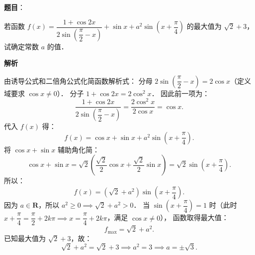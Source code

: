 \begin{answer}

\textbf{题目}：

若函数 $f(x) = \dfrac{1 + \cos 2x}{2\sin\left(\dfrac{\pi}{2} - x\right)} + \sin x + a^2 \sin\left(x + \dfrac{\pi}{4}\right)$ 的最大值为 $\sqrt{2} + 3$，试确定常数 $a$ 的值．

\textbf{解析}

由诱导公式和二倍角公式化简函数解析式：
分母 $2\sin\left(\dfrac{\pi}{2} - x\right) = 2\cos x$（定义域要求 $\cos x \neq 0$）．
分子 $1 + \cos 2x = 2\cos^2 x$．
因此前一项为：
\nopagebreak[4]
\[
\frac{1 + \cos 2x}{2\sin\left(\dfrac{\pi}{2} - x\right)} = \frac{2\cos^2 x}{2\cos x} = \cos x.
\]
代入 $f(x)$ 得：
\nopagebreak[4]
\[
f(x) = \cos x + \sin x + a^2 \sin\left(x + \frac{\pi}{4}\right).
\]
将 $\cos x + \sin x$ 辅助角化简：
\nopagebreak[4]
\[
\cos x + \sin x = \sqrt{2}\left(\frac{\sqrt{2}}{2}\cos x + \frac{\sqrt{2}}{2}\sin x\right) = \sqrt{2}\sin\left(x + \frac{\pi}{4}\right).
\]
所以：
\nopagebreak[4]
\[
f(x) = (\sqrt{2} + a^2)\sin\left(x + \frac{\pi}{4}\right).
\]
因为 $a \in \mathbf{R}$，所以 $a^2 \geqslant 0 \implies \sqrt{2} + a^2 > 0$．
当 $\sin\left(x + \dfrac{\pi}{4}\right) = 1$ 时（此时 $x + \dfrac{\pi}{4} = \dfrac{\pi}{2} + 2k\pi \implies x = \dfrac{\pi}{4} + 2k\pi$，满足 $\cos x \neq 0$），
函数取得最大值：
\nopagebreak[4]
\[
f_{\max} = \sqrt{2} + a^2.
\]
已知最大值为 $\sqrt{2} + 3$，故：
\nopagebreak[4]
\[
\sqrt{2} + a^2 = \sqrt{2} + 3 \implies a^2 = 3 \implies a = \pm\sqrt{3}.
\]


\end{answer}
